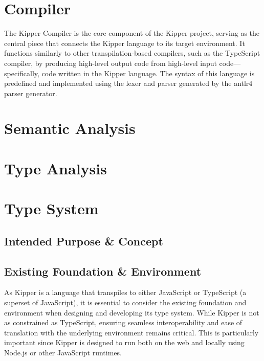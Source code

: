 \section{Compiler}
\label{sec:compiler}

The Kipper Compiler is the core component of the Kipper project, serving as the central piece that connects the Kipper language to its target environment. It functions similarly to other \gls{transpilation}-based compilers, such as the TypeScript compiler, by producing high-level output code from high-level input code—specifically, code written in the Kipper language. The syntax of this language is predefined and implemented using the lexer and parser generated by the \Gls{antlr4} parser generator.

\section{Semantic Analysis}
\label{sec:semantic-analysis}

\section{Type Analysis}
\label{sec:type-analysis}

\section{Type System}

\subsection{Intended Purpose \& Concept}

\subsection{Existing Foundation \& Environment}

As Kipper is a language that transpiles to either JavaScript or TypeScript (a superset of JavaScript), it is essential to consider the existing foundation and environment when designing and developing its type system. While Kipper is not as constrained as TypeScript, ensuring seamless interoperability and ease of translation with the underlying environment remains critical. This is particularly important since Kipper is designed to run both on the web and locally using Node.js or other JavaScript runtimes.

